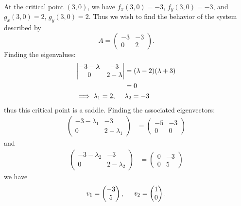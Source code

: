 \documentclass{article}
\begin{document}
\begin{itemize}
\begin{itemize}
        At the critical point $(3,0)$, we have $f_x(3,0) = -3$, $f_y(3,0) = -3$, and $g_x(3,0) = 2$, $g_y(3,0) = 2$. Thus we wish to find the behavior of the system described by 
        \[A = \begin{pmatrix}
            -3 & -3\\
            0 & 2
        \end{pmatrix}.\]
        Finding the eigenvalues:
        \begin{align*}
            \left|\begin{matrix}
                -3 - \lambda & -3\\
                0 & 2 - \lambda
            \end{matrix}\right| &= (\lambda - 2)(\lambda + 3)\\
            &= 0\\
            \implies \lambda_1 = 2, \hspace{0.5cm}& \lambda_2 = -3
        \end{align*}
        thus this critical point is a saddle. Finding the associated eigenvectors:
        \begin{align*}
            \begin{pmatrix}
                -3 - \lambda_1 & -3\\
                0 & 2 - \lambda_1
            \end{pmatrix} &= \begin{pmatrix}
                -5 & -3\\
                0 & 0
            \end{pmatrix}
        \end{align*}
        and
        \begin{align*}
            \begin{pmatrix}
                -3 - \lambda_2 & -3\\
                0 & 2 - \lambda_2
            \end{pmatrix} &= \begin{pmatrix}
                0 & -3\\
                0 & 5
            \end{pmatrix}
        \end{align*}
        we have
        \[v_1 = \begin{pmatrix}
            -3\\
            5
        \end{pmatrix}, \hspace{0.5cm} v_2 = \begin{pmatrix}
            1\\
            0
        \end{pmatrix}.\]
        

\end{itemize}
\end{itemize}
\end{document}
